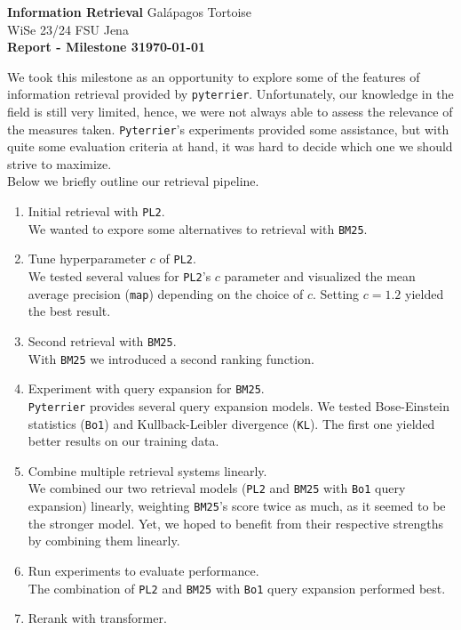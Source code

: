 \documentclass[DIN, pagenumber=false, fontsize=11pt, parskip=half]{scrartcl}
\newcommand{\mytitle}[1]{{\noindent\Large\textbf{#1}}}
\begin{document}
\noindent\textbf{Information Retrieval} \hfill Galápagos Tortoise\\
WiSe 23/24 \hfill FSU Jena\\

\mytitle{Report - Milestone 3\hfill \today}


We took this milestone as an opportunity to explore some of the features of information retrieval provided by \texttt{pyterrier}. Unfortunately, our knowledge in the field is still very limited, hence, we were not always able to assess the relevance of the measures taken. \texttt{Pyterrier}'s experiments provided some assistance, but with quite some evaluation criteria at hand, it was hard to decide which one we should strive to maximize.\\ 
Below we briefly outline our retrieval pipeline.\\
\begin{enumerate}
\item Initial retrieval with \texttt{PL2}.\\
We wanted to expore some alternatives to retrieval with \texttt{BM25}.
\item Tune hyperparameter \(c\) of \texttt{PL2}.\\
We tested several values for \texttt{PL2}'s \(c\) parameter and visualized the mean average precision (\texttt{map}) depending on the choice of \(c\). Setting \(c=1.2\) yielded the best result.
\item Second retrieval with \texttt{BM25}.\\
With \texttt{BM25} we introduced a second ranking function.
\item Experiment with query expansion for \texttt{BM25}.\\
\texttt{Pyterrier} provides several query expansion models. We tested Bose-Einstein statistics (\texttt{Bo1}) and Kullback-Leibler divergence (\texttt{KL}). The first one yielded better results on our training data.
\item Combine multiple retrieval systems linearly.\\
We combined our two retrieval models (\texttt{PL2} and \texttt{BM25} with \texttt{Bo1} query expansion) linearly, weighting \texttt{BM25}'s score twice as much, as it seemed to be the stronger model. Yet, we hoped to benefit from their respective strengths by combining them linearly.
\item Run experiments to evaluate performance.\\
The combination of \texttt{PL2} and \texttt{BM25} with \texttt{Bo1} query expansion performed best.
\item Rerank with transformer.
\end{enumerate}
\end{document}
